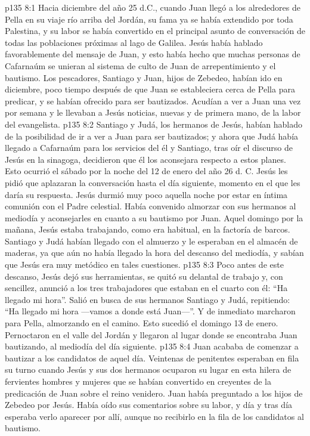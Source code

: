 \vs p135 8:1 Hacia diciembre del año 25 d.C., cuando Juan llegó a los alrededores de Pella en su viaje río arriba del Jordán, su fama ya se había extendido por toda Palestina, y su labor se había convertido en el principal asunto de conversación de todas las poblaciones próximas al lago de Galilea. Jesús había hablado favorablemente del mensaje de Juan, y esto había hecho que muchas personas de Cafarnaúm se unieran al sistema de culto de Juan de arrepentimiento y el bautismo. Los pescadores, Santiago y Juan, hijos de Zebedeo, habían ido en diciembre, poco tiempo después de que Juan se estableciera cerca de Pella para predicar, y se habían ofrecido para ser bautizados. Acudían a ver a Juan una vez por semana y le llevaban a Jesús noticias, nuevas y de primera mano, de la labor del evangelista.
\vs p135 8:2 Santiago y Judá, los hermanos de Jesús, habían hablado de la posibilidad de ir a ver a Juan para ser bautizados; y ahora que Judá había llegado a Cafarnaúm para los servicios del  él y Santiago, tras oír el discurso de Jesús en la sinagoga, decidieron que él los aconsejara respecto a estos planes. Esto ocurrió el sábado por la noche del 12 de enero del año 26 d. C. Jesús les pidió que aplazaran la conversación hasta el día siguiente, momento en el que les daría su respuesta. Jesús durmió muy poco aquella noche por estar en íntima comunión con el Padre celestial. Había convenido almorzar con sus hermanos al mediodía y aconsejarles en cuanto a su bautismo por Juan. Aquel domingo por la mañana, Jesús estaba trabajando, como era habitual, en la factoría de barcos. Santiago y Judá habían llegado con el almuerzo y le esperaban en el almacén de maderas, ya que aún no había llegado la hora del descanso del mediodía, y sabían que Jesús era muy metódico en tales cuestiones.
\vs p135 8:3 Poco antes de este descanso, Jesús dejó sus herramientas, se quitó su delantal de trabajo y, con sencillez, anunció a los tres trabajadores que estaban en el cuarto con él: “Ha llegado mi hora”. Salió en busca de sus hermanos Santiago y Judá, repitiendo: “Ha llegado mi hora ---vamos a donde está Juan---”. Y de inmediato marcharon para Pella, almorzando en el camino. Esto sucedió el domingo 13 de enero. Pernoctaron en el valle del Jordán y llegaron al lugar donde se encontraba Juan bautizando, al mediodía del día siguiente.
\vs p135 8:4 \pc Juan acababa de comenzar a bautizar a los candidatos de aquel día. Veintenas de penitentes esperaban en fila su turno cuando Jesús y sus dos hermanos ocuparon su lugar en esta hilera de fervientes hombres y mujeres que se habían convertido en creyentes de la predicación de Juan sobre el reino venidero. Juan había preguntado a los hijos de Zebedeo por Jesús. Había oído sus comentarios sobre su labor, y día y tras día esperaba verlo aparecer por allí, aunque no recibirlo en la fila de los candidatos al bautismo.
